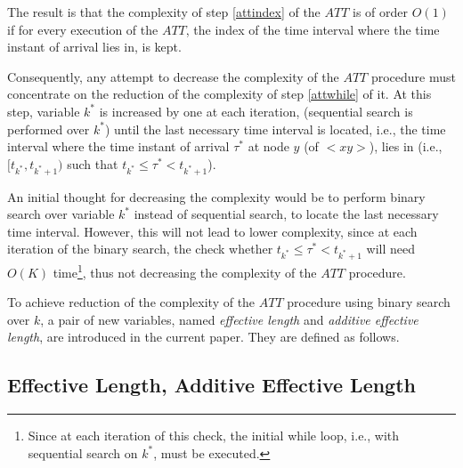 \documentclass[conference]{IEEEtran}
\begin{document}
The result is that the complexity of step \ref{attindex} of the $ATT$ is of order $O(1)$ if for every execution of the $ATT$, the index of the time interval where the time instant of arrival lies in, is kept.

Consequently, any attempt to decrease the complexity of the $ATT$ procedure must concentrate on the reduction of the complexity of step \ref{attwhile} of it. At this step, variable $k^*$ is increased by one at each iteration, (sequential search is performed over $k^*$) until the last necessary time interval is located, i.e., the time interval where the time instant of arrival $\tau^*$ at node $y$ (of $<xy>$), lies in (i.e., $[t_{k^*}, t_{{k^*}+1})$ such that $t_{k^*}\leq \tau^*<t_{{k^*}+1}$). 

An initial thought for decreasing the complexity would be to perform binary search \cite{ahuja} over variable $k^*$  instead of sequential search, to locate the last necessary time interval. However, this will not lead to lower complexity, since at each iteration of the binary search, the check whether $t_{k^*}\leq \tau^*<t_{{k^*}+1}$ will need $O(K)$ time\footnote{Since at each iteration of this check,  the initial while loop, i.e.,  with sequential search on $k^*$, must be executed.}, thus not decreasing the complexity of the $ATT$ procedure. 

To achieve reduction of the complexity of the $ATT$ procedure using binary search over $k$, a pair of new variables, named \emph{effective length} and \emph{additive effective length}, are introduced in the current paper. They are defined as follows.


\subsection{Effective Length, Additive Effective Length}
\end{document}
